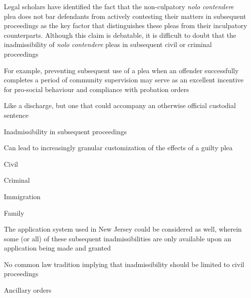 Legal scholars have identified the fact that the non-culpatory \textit{nolo contendere} plea does not bar defendants from actively contesting their matters in subsequent proceedings as the key factor that distinguishes these pleas from their inculpatory counterparts. Although this claim is debatable, it is difficult to doubt that the inadmissibility of \textit{nolo contendere} pleas in subsequent civil or criminal proceedings 

For example, preventing subsequent use of a plea when an offender successfully completes a period of community supervision may serve as an excellent incentive for pro-social behaviour and compliance with probation orders

Like a discharge, but one that could accompany an otherwise official custodial sentence

Inadmissibility in subsequent proceedings

Can lead to increasingly granular customization of the effects of a guilty plea

Civil

Criminal

Immigration

Family

The application system used in New Jersey could be considered as well, wherein some (or all) of these subsequent inadmissibilities are only available upon an application being made and granted

No common law tradition implying that inadmissibility should be limited to civil proceedings

Ancillary orders
